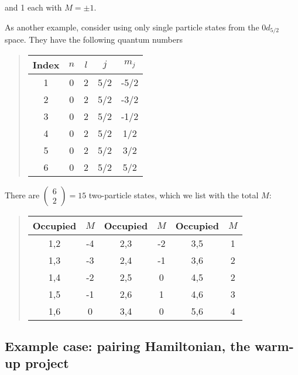 \noindent
and 1 each with $M = \pm 1$.




As another example, consider using only single particle states from the $0d_{5/2}$ space. 
They have the following quantum numbers


\begin{quote}
\begin{tabular}{ccccc}
\hline
\multicolumn{1}{c}{ Index } & \multicolumn{1}{c}{ $n$ } & \multicolumn{1}{c}{ $l$ } & \multicolumn{1}{c}{ $j$ } & \multicolumn{1}{c}{ $m_j$ } \\
\hline
1     & 0   & 2   & 5/2 & -5/2  \\
2     & 0   & 2   & 5/2 & -3/2  \\
3     & 0   & 2   & 5/2 & -1/2  \\
4     & 0   & 2   & 5/2 & 1/2   \\
5     & 0   & 2   & 5/2 & 3/2   \\
6     & 0   & 2   & 5/2 & 5/2   \\
\hline
\end{tabular}
\end{quote}

\noindent
There are $\left ( \begin{array}{c} 6 \\ 2 \end{array} \right) = 15$ two-particle states, 
which we list with the total $M$:


\begin{quote}
\begin{tabular}{cccccc}
\hline
\multicolumn{1}{c}{ Occupied } & \multicolumn{1}{c}{ $M$ } & \multicolumn{1}{c}{ Occupied } & \multicolumn{1}{c}{ $M$ } & \multicolumn{1}{c}{ Occupied } & \multicolumn{1}{c}{ $M$ } \\
\hline
1,2      & -4  & 2,3      & -2  & 3,5      & 1   \\
1,3      & -3  & 2,4      & -1  & 3,6      & 2   \\
1,4      & -2  & 2,5      & 0   & 4,5      & 2   \\
1,5      & -1  & 2,6      & 1   & 4,6      & 3   \\
1,6      & 0   & 3,4      & 0   & 5,6      & 4   \\
\hline
\end{tabular}
\end{quote}

\noindent




\subsection{Example case: pairing Hamiltonian, the warm-up project}


